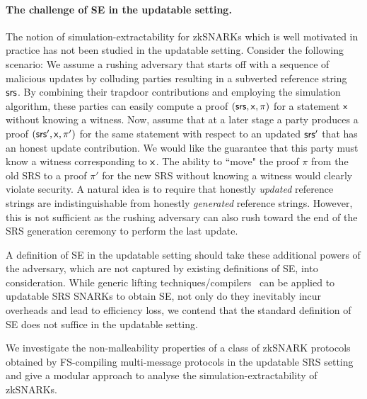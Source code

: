 \paragraph{The challenge of SE in the updatable setting.}

The notion of simulation-extractability for zkSNARKs which is well motivated in practice has not been studied in the updatable setting.
Consider the following scenario: We assume a rushing adversary that starts off with a sequence of malicious updates by colluding parties resulting in a subverted reference string $\mathsf{srs}$. By combining their trapdoor contributions and employing the simulation algorithm, these parties can easily compute a proof $(\mathsf{srs},\mathsf{x},\pi)$ for a statement $\mathsf{x}$ without knowing a witness. Now, assume that at a later stage a party produces a proof $(\mathsf{srs}',\mathsf{x},\pi')$ for the same statement with respect to an updated $\mathsf{srs}'$ that has an honest update contribution. We would like the guarantee that this party must know a witness corresponding to $\mathsf{x}$. The ability to ``move" the proof $\pi$ from the old SRS to a proof $\pi'$ for the new SRS without knowing a witness would clearly violate security. A natural idea is to require that honestly \emph{updated} reference strings are indistinguishable from honestly \emph{generated} reference strings. However, this is not sufficient as the rushing adversary can also rush toward the end of the SRS generation ceremony to perform the last update.


A definition of SE in the updatable setting should take these additional powers of the adversary, which are not captured by existing definitions of SE, into consideration.
While generic lifting techniques/compilers~\cite{EPRINT:KZMQCP15,CCS:AbdRamSla20} can be applied to updatable SRS SNARKs to obtain SE, not only do they inevitably incur overheads and lead to efficiency loss, we contend that the standard definition of SE does not suffice in the updatable setting.

We investigate the non-malleability properties of a class of zkSNARK protocols obtained by FS-compiling multi-message protocols in the updatable SRS setting and give a modular approach to analyse the simulation-extractability of zkSNARKs.

